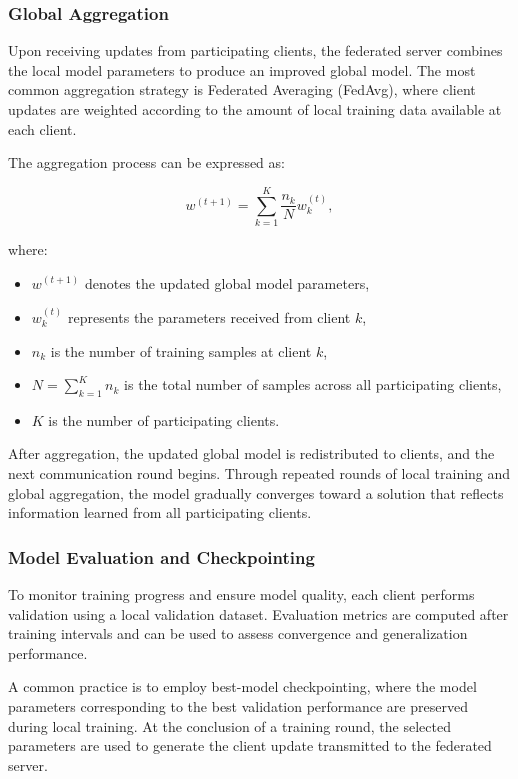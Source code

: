\subsubsection{Global Aggregation}

Upon receiving updates from participating clients, the federated server combines the local model parameters to produce an improved global model. The most common aggregation strategy is Federated Averaging (FedAvg), where client updates are weighted according to the amount of local training data available at each client.

The aggregation process can be expressed as:

\[
w^{(t+1)} = \sum_{k=1}^{K} \frac{n_k}{N} w_k^{(t)},
\]

where:

\begin{itemize}
	\item $w^{(t+1)}$ denotes the updated global model parameters,
	\item $w_k^{(t)}$ represents the parameters received from client $k$,
	\item $n_k$ is the number of training samples at client $k$,
	\item $N = \sum_{k=1}^{K} n_k$ is the total number of samples across all participating clients,
	\item $K$ is the number of participating clients.
\end{itemize}

After aggregation, the updated global model is redistributed to clients, and the next communication round begins. Through repeated rounds of local training and global aggregation, the model gradually converges toward a solution that reflects information learned from all participating clients.

\subsubsection{Model Evaluation and Checkpointing}

To monitor training progress and ensure model quality, each client performs validation using a local validation dataset. Evaluation metrics are computed after training intervals and can be used to assess convergence and generalization performance.

A common practice is to employ best-model checkpointing, where the model parameters corresponding to the best validation performance are preserved during local training. At the conclusion of a training round, the selected parameters are used to generate the client update transmitted to the federated server.


